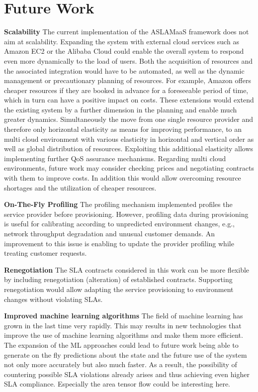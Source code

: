 \section{Future Work}
\textbf{Scalability }
The current implementation of the ASLAMaaS framework does not aim at scalability. Expanding the system with external cloud services such as Amazon EC2 or the Alibaba Cloud could enable the overall system to respond even more dynamically to the load of users. Both the acquisition of resources and the associated integration would have to be automated, as well as the dynamic management or precautionary planning of resources. For example, Amazon offers cheaper resources if they are booked in advance for a foreseeable period of time, which in turn can have a positive impact on costs. These extensions would extend the existing system by a further dimension in the planning and enable much greater dynamics. Simultaneously the move from one single resource provider and therefore only horizontal elasticity as means for improving performance, to an multi cloud environment with various elasticity in horizontal and vertical order as well as global distribution of resources. Exploiting this additional elasticity allows implementing further QoS assurance mechanisms. Regarding multi cloud environments, future work may consider checking prices and negotiating contracts with them to improve costs. In addition this would allow overcoming resource shortages and the utilization of cheaper resources.

\textbf{On-The-Fly Profiling} The profiling mechanism implemented profiles the service provider before provisioning. However, profiling data during provisioning is useful for calibrating  according to unpredicted environment changes, e.g., network throughput degradation and unusual customer demands. An improvement to this issue is enabling to update the provider profiling while treating customer requests. 

\textbf{Renegotiation} The SLA contracts considered in this work can be more flexible by including renegotiation (alteration) of established contracts. Supporting renegotiation would allow adapting the service provisioning to environment changes without violating SLAs. 

\textbf{Improved machine learning algorithms} The field of machine learning has grown in the last time very rapidly. This may results in new technologies that improve the use of machine learning algorithms and make them more efficient. The expansion of the ML approaches could lead to future work being able to generate on the fly predictions about the state and the future use of the system not only more accurately but also much faster. As a result, the possibility of countering possible SLA violations already arises and thus achieving even higher SLA compliance. Especially the area tensor flow could be interesting here.



